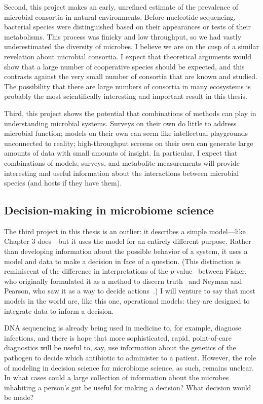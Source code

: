 Second, this project makes an early, unrefined estimate of the prevalence
of microbial consortia in natural environments. Before nucleotide sequencing,
bacterial species were distinguished based on their appearances or tests
of their metabolisms. This process was finicky and low throughput, so we
had vastly underestimated the diversity of microbes. I believe we are on
the cusp of a similar revelation about microbial consortia. I expect that
theoretical arguments would show that a large number of cooperative species
should be expected, and this contrasts against the very small number of
consortia that are known and studied. The possibility that there are
large numbers of consortia in many ecosystems is probably the most
scientifically interesting and important result in this thesis.

Third, this project shows the potential that combinations of methods
can play in understanding microbial systems. Surveys on their own
do little to address microbial function; models on their own
can seem like intellectual playgrounds unconnected to reality; high-throughput
screens on their own can generate large amounts of data with small amounts
of insight. In particular, I expect that combinations of models, surveys,
and metabolite measurements will provide interesting and useful
information about the interactions between microbial species (and hosts if
they have them).

\subsection{Decision-making in microbiome science}
The third project in this thesis is an outlier: it describes a
simple model---like Chapter 3 does---but it uses the model for
an entirely different purpose. Rather than developing information
about the possible behavior of a system, it uses a model and data to
make a decision in face of a question. (This distinction is reminiscent
of the difference in interpretations of the $p$-value~\cite{goodman_toward_1999} between Fisher,
who originally formulated it as a method to discern truth~\cite{fisher_statistical_1973}
and Neyman and Pearson, who saw it as a way to decide actions~\cite{neyman_problem_1933}.)
I will venture to say that most models in the world are, like this one,
operational models: they are designed to integrate data to inform a
decision.

DNA sequencing is already being used in medicine to, for example,
diagnose infections, and there is hope that more sophisticated,
rapid, point-of-care diagnostics will be useful to, say, use information
about the genetics of the pathogen to decide
which antibiotic to administer to a patient.
However, the role of modeling in decision science
for microbiome science, as such, remains unclear. In what cases could
a large collection of information about the microbes inhabiting a
person's gut be useful for making a decision? What decision would
be made?


